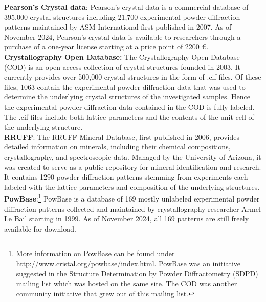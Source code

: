 \textbf{Pearson's Crystal data}:\cite{PearsonWeb} Pearson's crystal data is a commercial database of 395,000 crystal structures including 21,700 experimental powder diffraction patterns maintained by ASM International first published in 2007\cite{PaulingWeb}.  As of November 2024, Pearson's crystal data is available to researchers through a purchase of a one-year license starting at a price point of 2200 \euro.\\


\textbf{Crystallography Open Database:} \cite{CODWeb} The Crystallography Open Database (COD) is an open-access collection of crystal structures founded in 2003\cite{Graulis2009cod}. It currently provides over 500,000 crystal structures in the form of .cif files. Of these files, 1063 contain the experimental powder diffraction data that was used to determine the underlying crystal structures of the investigated samples. Hence the experimental powder diffraction data contained in the COD is fully labeled. The .cif files include both lattice parameters and the contents of the unit cell of the underlying structure. \\

\textbf{RRUFF}: \cite{RRUFFWeb} The RRUFF Mineral Database, first published in 2006, provides detailed information on minerals, including their chemical compositions, crystallography, and spectroscopic data. \cite{lafuente2015} Managed by the University of Arizona, it was created to serve as a public repository for mineral identification and research. It contains \num{1290} powder diffraction patterns stemming from experiments each labeled with the lattice parameters and composition of the underlying structures. \\

\textbf{PowBase}:\footnote{More information on PowBase can be found under \url{http://www.cristal.org/powbase/index.html}. PowBase was an initiative suggested in the Structure Determination by Powder Diffractometry (SDPD) mailing list which was hosted on the same site. The COD was another community initiative that grew out of this mailing list.} PowBase is a database of 169 mostly unlabeled experimental powder diffraction patterns collected and maintained by crystallography researcher Armel Le Bail starting in 1999. As of November 2024, all 169 patterns are still freely available for download. \\


